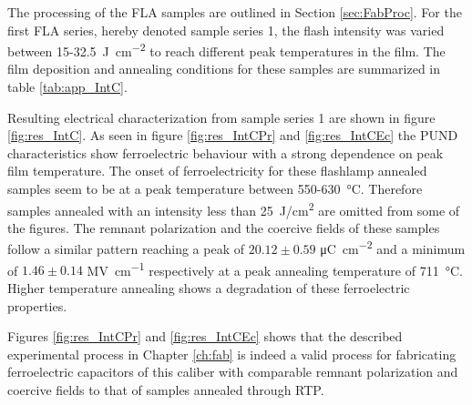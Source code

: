 \documentclass[11pt,twoside]{eitExjobb}
\begin{document}

The processing of the FLA samples are outlined in Section \ref{sec:FabProc}. For
the first FLA series, hereby denoted sample series 1, the flash intensity was
varied between 15-\SI{32.5}{\joule\per\centi\meter\squared} to reach different peak
temperatures in the film. The film deposition and annealing conditions for these
samples are summarized in table \ref{tab:app_IntC}.

Resulting electrical characterization from sample series 1 are shown in
figure \ref{fig:res_IntC}. As seen in figure \ref{fig:res_IntCPr} and
\ref{fig:res_IntCEc} the PUND characteristics show ferroelectric behaviour with
a strong dependence on peak film temperature. The onset of ferroelectricity for
these flashlamp annealed samples seem to be at a peak temperature between
550-\SI{630}{\celsius}. Therefore samples annealed with an intensity less than
\SI{25}{\joule/\centi\meter\squared} are omitted from some of the figures.
The remnant polarization and the coercive fields of these samples follow a similar
pattern reaching a peak of $20.12 \pm 0.59$ \si{\micro\coulomb\per\centi\meter\squared} and a
minimum of $1.46 \pm 0.14$ \si{\mega\volt\per\centi\meter} respectively at a peak
annealing temperature of \SI{711}{\celsius}. Higher temperature annealing
shows a degradation of these ferroelectric properties. %

Figures \ref{fig:res_IntCPr} and \ref{fig:res_IntCEc} shows that the
described experimental process in Chapter \ref{ch:fab} is indeed a valid process for
fabricating ferroelectric capacitors of this caliber with comparable remnant
polarization and coercive fields to that of samples annealed through RTP.
\end{document}
